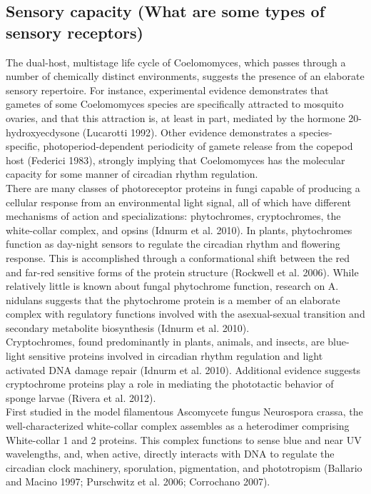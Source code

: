 \subsection{Sensory capacity (What are some types of sensory receptors)}
The dual-host, multistage life cycle of Coelomomyces, which passes through a number of chemically distinct environments, suggests the presence of an elaborate sensory repertoire. For instance, experimental evidence demonstrates that gametes of some Coelomomyces species are specifically attracted to mosquito ovaries, and that this attraction is, at least in part, mediated by the hormone 20-hydroxyecdysone (Lucarotti 1992). Other evidence demonstrates a species-specific, photoperiod-dependent periodicity of gamete release from the copepod host (Federici 1983), strongly implying that Coelomomyces has the molecular capacity for some manner of circadian rhythm regulation. \\
\indent There are many classes of photoreceptor proteins in fungi capable of producing a cellular response from an environmental light signal, all of which have different mechanisms of action and specializations: phytochromes, cryptochromes, the white-collar complex, and opsins (Idnurm et al. 2010). In plants, phytochromes function as day-night sensors to regulate the circadian rhythm and flowering response. This is accomplished through a conformational shift between the red and far-red sensitive forms of the protein structure (Rockwell et al. 2006). While relatively little is known about fungal phytochrome function, research on A. nidulans suggests that the phytochrome protein is a member of an elaborate complex with regulatory functions involved with the asexual-sexual transition and secondary metabolite biosynthesis (Idnurm et al. 2010). \\
\indent Cryptochromes, found predominantly in plants, animals, and insects, are blue-light sensitive proteins involved in circadian rhythm regulation and light activated DNA damage repair (Idnurm et al. 2010). Additional evidence suggests cryptochrome proteins play a role in mediating the phototactic behavior of sponge larvae (Rivera et al. 2012). \\
\indent First studied in the model filamentous Ascomycete fungus Neurospora crassa, the well-characterized white-collar complex assembles as a heterodimer comprising White-collar 1 and 2 proteins. This complex functions to sense blue and near UV wavelengths, and, when active, directly interacts with DNA to regulate the circadian clock machinery, sporulation, pigmentation, and phototropism (Ballario and Macino 1997; Purschwitz et al. 2006; Corrochano 2007). \\ 
